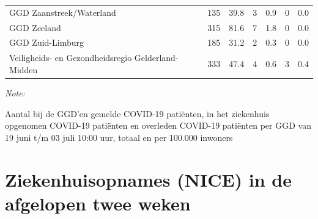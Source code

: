 \documentclass[
  english,
  man,floatsintext]{apa6}
\begin{document}
\begin{table}
\begin{threeparttable}
\begin{tabular}{lrrrrrr}
GGD Zaanstreek/Waterland & 135 & 39.8 & 3 & 0.9 & 0 & 0.0\\
GGD Zeeland & 315 & 81.6 & 7 & 1.8 & 0 & 0.0\\
GGD Zuid-Limburg & 185 & 31.2 & 2 & 0.3 & 0 & 0.0\\
Veiligheids- en Gezondheidsregio Gelderland-Midden & 333 & 47.4 & 4 & 0.6 & 3 & 0.4\\
\bottomrule
\end{tabular}
\begin{tablenotes}
\item \textit{Note: } 
\item Aantal bij de GGD’en gemelde COVID-19 patiënten, in het ziekenhuis opgenomen COVID-19 patiënten en overleden COVID-19 patiënten per GGD van 19 juni t/m 03 juli 10:00 uur, totaal en per 100.000 inwoners
\end{tablenotes}
\end{threeparttable}
\endgroup{}
\end{table}

\newpage

\hypertarget{ziekenhuisopnames-nice-in-de-afgelopen-twee-weken}{%
\section{Ziekenhuisopnames (NICE) in de afgelopen twee weken}\label{ziekenhuisopnames-nice-in-de-afgelopen-twee-weken}}
\end{document}
